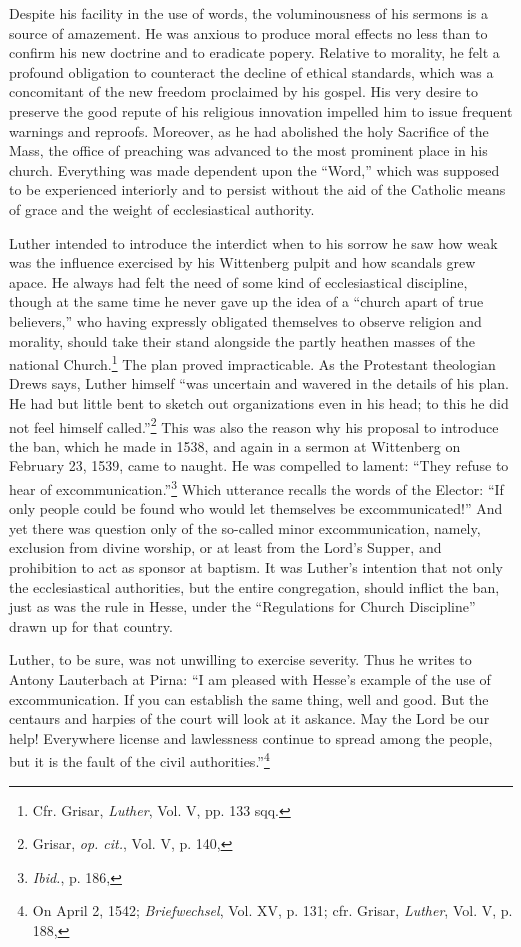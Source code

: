 Despite his facility in the use of words, the voluminousness of his
sermons is a source of amazement. He was anxious to produce moral
effects no less than to confirm his new doctrine and to eradicate popery.
Relative to morality, he felt a profound obligation to counteract the
decline of ethical standards, which was a concomitant of the
new freedom proclaimed by his gospel. His very desire to preserve the
good repute of his religious innovation impelled him to issue frequent
warnings and reproofs. Moreover, as he had abolished the holy Sacrifice
of the Mass, the office of preaching was advanced to the most
prominent place in his church. Everything was made dependent
upon the “Word,” which was supposed to be experienced interiorly
and to persist without the aid of the Catholic means of grace and the
weight of ecclesiastical authority.

Luther intended to introduce the interdict when to his sorrow he
saw how weak was the influence exercised by his Wittenberg pulpit
and how scandals grew apace. He always had felt the need of some
kind of ecclesiastical discipline, though at the same time he never
gave up the idea of a “church apart of true believers,” who having
expressly obligated themselves to observe religion and morality,
should take their stand alongside the partly heathen masses of the
national Church.\footnote{Cfr. Grisar, \textit{Luther}, Vol. V, pp. 133 sqq.}
The plan proved impracticable. As the Protestant
theologian Drews says, Luther himself “was uncertain and
wavered in the details of his plan. He had but little bent to sketch out
organizations even in his head; to this he did not feel himself
called.”\footnote{Grisar, \textit{op. cit.}, Vol. V, p. 140,}
This was also the reason why his proposal to introduce the
ban, which he made in 1538, and again in a sermon at Wittenberg
on February 23, 1539, came to naught. He was compelled to lament:
“They refuse to hear of excommunication.”\footnote{\textit{Ibid.}, p. 186,}
Which utterance recalls
the words of the Elector: “If only people could be found who would
let themselves be excommunicated!” And yet there was question only
of the so-called minor excommunication, namely, exclusion from
divine worship, or at least from the Lord’s Supper, and prohibition to
act as sponsor at baptism. It was Luther’s intention that not only the
ecclesiastical authorities, but the entire congregation, should inflict the
ban, just as was the rule in Hesse, under the “Regulations for Church
Discipline” drawn up for that country.

Luther, to be sure, was not unwilling to exercise severity. Thus he
writes to Antony Lauterbach at Pirna: “I am pleased with Hesse’s
example of the use of excommunication. If you can establish the same
thing, well and good. But the centaurs and harpies of the court will
look at it askance. May the Lord be our help! Everywhere license and
lawlessness continue to spread among the people, but it is the fault of
the civil authorities.”\footnote{On April 2, 1542; \textit{Briefwechsel}, Vol. XV, p. 131; cfr. Grisar, \textit{Luther}, Vol. V, p. 188,}

